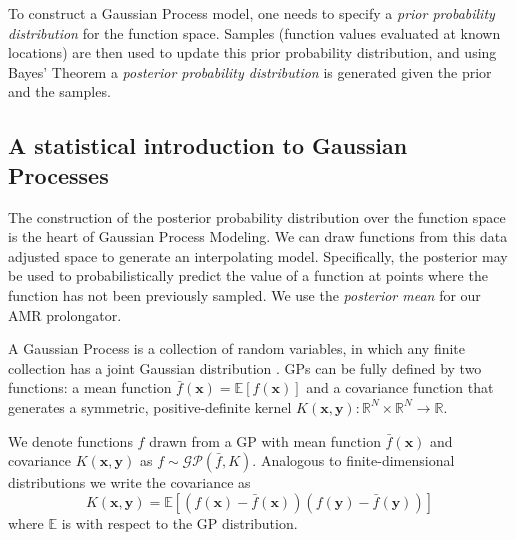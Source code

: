 \documentclass{article}%
\begin{document}
To construct a Gaussian Process model, one needs to specify a \textit{prior probability distribution} for
 the function space. Samples (function values evaluated at known locations)
are then used to update this prior probability distribution, and using Bayes' Theorem a \textit{posterior probability
distribution} is generated given the prior and the samples.

\subsection{A statistical introduction to Gaussian Processes}

The construction of the posterior probability distribution over the function space is the heart of
Gaussian Process Modeling. We can draw functions from this data adjusted space to generate an interpolating model.
 Specifically, the posterior may be used to probabilistically predict the value of a function at points where the
function has not been previously sampled. We use the \textit{posterior mean}
for our AMR prolongator.

A Gaussian Process is a collection of random variables, in which any finite collection has a joint Gaussian distribution
\cite{Rasmussen2005}\cite{pattern}.
GPs can be fully defined by two functions:
 a mean function $\bar{f}(\mathbf{x}) = \mathbb{E}[f(\mathbf{x})]$ and a
 covariance function that generates a symmetric, positive-definite kernel
 $K(\mathbf{x}, \mathbf{y}): \mathbb{R}^N\times\mathbb{R}^N \to \mathbb{R}$.

We denote functions $f$ drawn from a GP with mean function $\bar{f}(\mathbf{x})$ and covariance
$K(\mathbf{x}, \mathbf{y})$ as $f\sim \mathcal{GP}(\bar{f}, K)$. Analogous to finite-dimensional
distributions we write the covariance as
\begin{equation} 
K(\mathbf{x}, \mathbf{y}) = \mathbb{E}\left[\left(f(\mathbf{x}) - \bar{f}(\mathbf{x})\right)
\left(f(\mathbf{y}) - \bar{f}(\mathbf{y})\right)\right]
\end{equation}
where $\mathbb{E}$ is with respect to the GP distribution.
\end{document}
